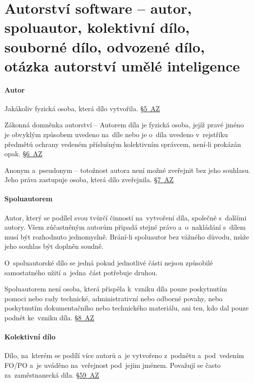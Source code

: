 \section{Autorství software -- autor, spoluautor, kolektivní dílo, souborné dílo, odvozené dílo, otázka autorství umělé inteligence}

\paragraph{Autor} Jakákoliv fyzická osoba, která dílo vytvořila. \href{https://www.zakonyprolidi.cz/cs/2000-121#p5}{§5~AZ}

Zákonná domněnka autorství -- Autorem díla je fyzická osoba, jejíž pravé jméno je obvyklým způsobem uvedeno na~díle nebo je o~díla uvedeno v~rejstříku předmětů ochrany vedeném příslušným kolektivním správcem, není-li prokázán opak. \href{https://www.zakonyprolidi.cz/cs/2000-121#p6}{§6~AZ}

Anonym a~pseudonym -- totožnost autora není možné zveřejnit bez jeho souhlasu. Jeho práva zastupuje osoba, která dílo zveřejnila. \href{https://www.zakonyprolidi.cz/cs/2000-121#p7}{§7~AZ}

\paragraph{Spoluautorem} Autor, který se podílel svou tvůrčí činností na~vytvoření díla, společně s~dalšími autory. Všem zúčastněným autorům připadá stejné právo a~o~nakládání s~dílem musí být rozhodnuto jednomyslně. Brání-li spoluautor bez vážného důvodu, může jeho souhlas být doplněn soudně.

O~spoluautorské dílo se jedná pokud jednotlivé části nejsou způsobilé samostatného užití a~jedna~část potřebuje druhou.

Spoluautorem není osoba, která přispěla k~vzniku díla pouze poskytnutím pomoci nebo rady technické, administrativní nebo odborné povahy, nebo poskytnutím dokumentačního nebo technického materiálu, ani ten, kdo dal pouze podnět ke~vzniku díla. \href{https://www.zakonyprolidi.cz/cs/2000-121#p8}{§8~AZ}

\paragraph{Kolektivní dílo} Dílo, na~kterém se podílí více autorů a~je vytvořeno z~podnětu a~pod~vedením FO/PO a~je uváděno na~veřejnost pod~jejím jménem. Považují se často za~zaměstnanecká díla. \href{https://www.zakonyprolidi.cz/cs/2000-121#p59}{§59~AZ}

